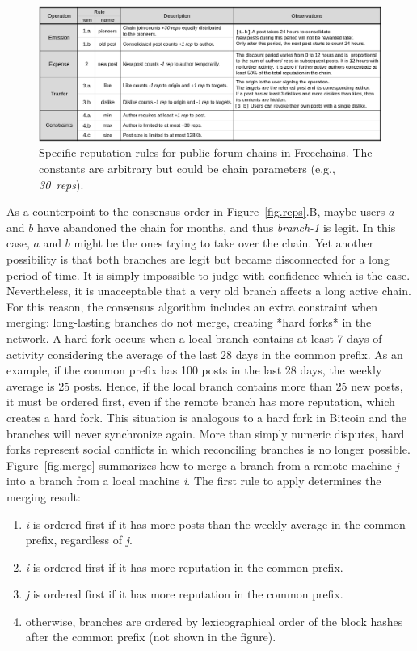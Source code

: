 \documentclass[10pt,journal,compsoc]{IEEEtran}
\newcommand{\FC}       {Freechains\xspace}
\newcommand{\nreps}[1] {\emph{#1~reps\xspace}}
\begin{document}
\begin{figure}
\centering
\includegraphics[width=\textwidth]{rules.png}
\caption{
    Specific reputation rules for public forum chains in \FC.
    The constants are arbitrary but could be chain parameters
    (e.g., \nreps{30}).
}
\label{fig.rules}
\end{figure}

As a counterpoint to the consensus order in Figure~\ref{fig.reps}.B, maybe
users $a$ and $b$ have abandoned the chain for months, and thus \emph{branch-1}
is legit.
In this case, $a$ and $b$ might be the ones trying to take over the chain.
Yet another possibility is that both branches are legit but became disconnected
for a long period of time.
It is simply impossible to judge with confidence which is the case.
Nevertheless, it is unacceptable that a very old branch affects a long active
chain.
For this reason, the consensus algorithm includes an extra constraint when
merging: long-lasting branches do not merge, creating *hard forks* in the
network.
A hard fork occurs when a local branch contains at least 7 days of activity
considering the average of the last 28 days in the common prefix.
As an example, if the common prefix has 100 posts in the last 28 days, the
weekly average is 25 posts.
Hence, if the local branch contains more than 25 new posts, it must be ordered
first, even if the remote branch has more reputation, which creates a hard
fork.
This situation is analogous to a hard fork in Bitcoin and the branches will
never synchronize again.
More than simply numeric disputes, hard forks represent social conflicts in
which reconciling branches is no longer possible.
%
Figure~\ref{fig.merge} summarizes how to merge a branch from a remote machine
\emph{j} into a branch from a local machine \emph{i}.
The first rule to apply determines the merging result:
\begin{enumerate}
    \item \emph{i} is ordered first if it has more posts than the weekly
          average in the common prefix, regardless of \emph{j}.
    \item \emph{i} is ordered first if it has more reputation in the common
          prefix.
    \item \emph{j} is ordered first if it has more reputation in the common
          prefix.
    \item otherwise, branches are ordered by lexicographical order of the block
          hashes after the common prefix (not shown in the figure).
\end{enumerate}
\end{document}
